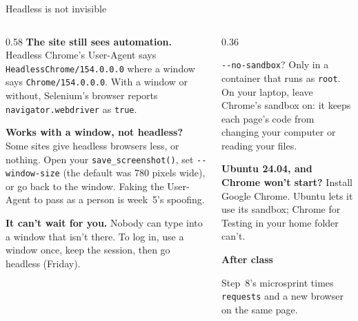 \documentclass[9pt,aspectratio=169]{beamer}
\begin{document}
\begin{frame}{Headless is not invisible}
    \begin{columns}[T]
        \begin{column}{0.58\textwidth}\small
            \textbf{The site still sees automation.} Headless Chrome's User-Agent says \texttt{HeadlessChrome/154.0.0.0} where a window says \texttt{Chrome/154.0.0.0}. With a window or without, Selenium's browser reports \texttt{navigator.webdriver} as \texttt{true}.

            \medskip
            \textbf{Works with a window, not headless?} Some sites give headless browsers less, or nothing. Open your \texttt{save\_screenshot()}, set \texttt{-{}-window-size} (the default was 780 pixels wide), or go back to the window. Faking the User-Agent to pass as a person is week~5's spoofing.

            \medskip
            \textbf{It can't wait for you.} Nobody can type into a window that isn't there. To log in, use a window once, keep the session, then go headless (Friday).
        \end{column}
        \begin{column}{0.36\textwidth}
            \begin{alertblock}{\texttt{-{}-no-sandbox}?}
                \footnotesize Only in a container that runs as \texttt{root}. On your laptop, leave Chrome's sandbox on: it keeps each page's code from changing your computer or reading your files.

                \smallskip
                \footnotesize\textbf{Ubuntu 24.04, and Chrome won't start?} Install Google Chrome. Ubuntu lets it use its sandbox; Chrome for Testing in your home folder can't.
            \end{alertblock}

            \medskip
            \textbf{After class}\\[2pt]
            {\footnotesize Step~8's microsprint times \texttt{requests} and a new browser on the same page.\par}
        \end{column}
    \end{columns}
\end{frame}
\end{document}
